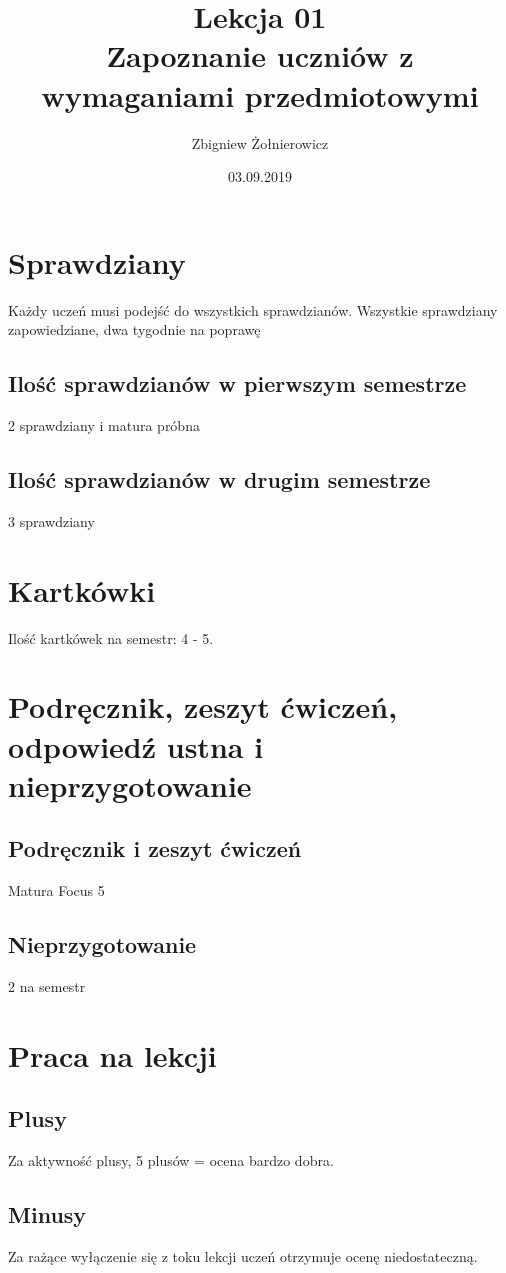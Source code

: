 \documentclass[a4paper]{article}
\begin{document}
\title{{\huge Lekcja 01} \\
{\large Zapoznanie uczniów z wymaganiami przedmiotowymi}}
\author{Zbigniew Żołnierowicz}
\date{03.09.2019}
\maketitle
\section{Sprawdziany}
Każdy uczeń musi podejść do wszystkich sprawdzianów. Wszystkie sprawdziany zapowiedziane, dwa tygodnie na poprawę
\subsection{Ilość sprawdzianów w pierwszym semestrze}
2 sprawdziany i matura próbna
\subsection{Ilość sprawdzianów w drugim semestrze}
3 sprawdziany
\section{Kartkówki}
Ilość kartkówek na semestr: 4 - 5.
\section{Podręcznik, zeszyt ćwiczeń, odpowiedź ustna i nieprzygotowanie}
\subsection{Podręcznik i zeszyt ćwiczeń}
Matura Focus 5
\subsection{Nieprzygotowanie}
2 na semestr
\section{Praca na lekcji}
\subsection{Plusy}
Za aktywność plusy, 5 plusów = ocena bardzo dobra.
\subsection{Minusy}
Za rażące wyłączenie się z toku lekcji uczeń otrzymuje ocenę niedostateczną.
\end{document}
